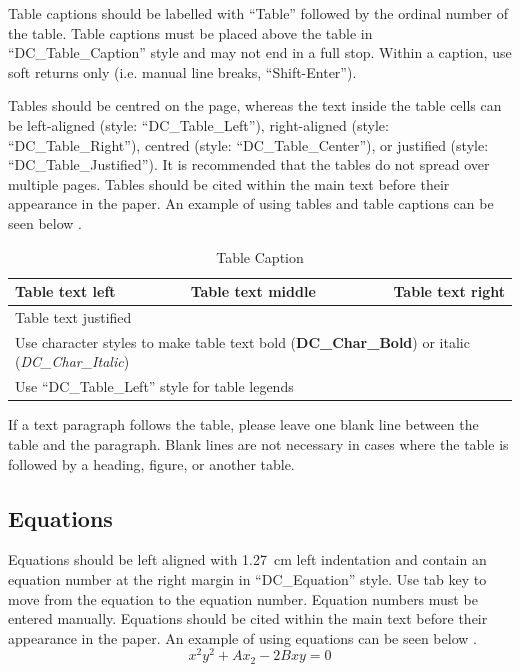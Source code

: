 \documentclass{design}
\begin{document}
Table captions should be labelled with “Table” followed by the ordinal number of the table. Table captions must be placed above the table in “DC\_Table\_Caption” style and may not end in a full stop. Within a caption, use soft returns only (i.e. manual line breaks, “Shift-Enter”).

Tables should be centred on the page, whereas the text inside the table cells can be left-aligned (style: “DC\_Table\_Left”), right-aligned (style: “DC\_Table\_Right”), centred (style: “DC\_Table\_Center”), or justified (style: “DC\_Table\_Justified”). It is recommended that the tables do not spread over multiple pages. Tables should be cited within the main text before their appearance in the paper. An example of using tables and table captions can be seen below .

\begin{table}[h!]
    \centering
    \caption{Table Caption}
    \label{tab:one}
    \begin{tabular}{ |l|c|r| }
        \hline
        Table text left & Table text middle & Table text right \\
        \hline
        \multicolumn{3}{|l|}{Table text justified} \\
        \hline
        \multicolumn{3}{|l|}{Use character styles to make table text bold (\textbf{DC\_Char\_Bold}) or italic (\textit{DC\_Char\_Italic})} \\
        \hline
        \multicolumn{3}{l}{Use “DC\_Table\_Left” style for table legends}
    \end{tabular}
\end{table}

If a text paragraph follows the table, please leave one blank line between the table and the paragraph. Blank lines are not necessary in cases where the table is followed by a heading, figure, or another table.

\subsection{Equations}

Equations should be left aligned with \SI{1.27}{\centi\metre} left indentation and contain an equation number at the right margin in “DC\_Equation” style. Use tab key to move from the equation to the equation number. Equation numbers must be entered manually. Equations should be cited within the main text before their appearance in the paper. An example of using equations can be seen below .
\begin{equation}
    x^2y^2 + Ax_2 - 2Bxy = 0
    \label{equ:one}
\end{equation}
\end{document}

